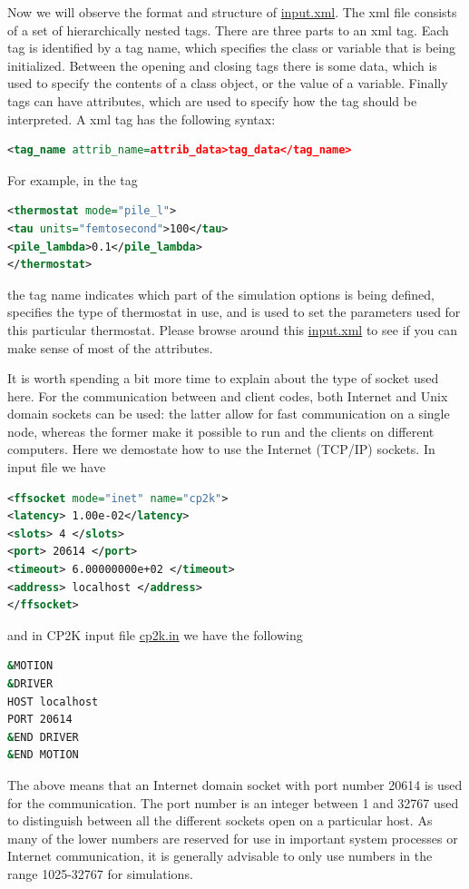 \documentclass{article}
\begin{document}
\begin{Exercise}[label={inputs},title={Keywords, outputs, and units of \ipi{}}]
\Question
Now we will observe the format and structure of \url{input.xml}.
The xml file consists of a set of hierarchically nested tags. There are three
parts to an xml tag. Each tag is identified by a tag name, which specifies the class
or variable that is being initialized. Between the opening and closing tags there is some data, 
which is used to specify the
contents of a class object, or the value of a variable. Finally tags can have attributes,
which are used to specify how the tag should be interpreted.
A xml tag has the following syntax:
\begin{lstlisting}[language=xml]
<tag_name attrib_name=attrib_data>tag_data</tag_name>
\end{lstlisting}
For example, in the tag
\begin{lstlisting}[language=xml]
<thermostat mode="pile_l">
<tau units="femtosecond">100</tau> 
<pile_lambda>0.1</pile_lambda>
</thermostat>
\end{lstlisting}
the tag name  indicates which part of the simulation options is being defined,
 specifies the type of thermostat in use,
and  is used to set the parameters used for this particular thermostat.
Please browse around this \url{input.xml} to see if you can make sense of most of the attributes.

\Question
It is worth spending a bit more time to explain about the type of socket used here.
For the communication between \ipi{} and client codes, both Internet and Unix domain sockets can be used: the
latter allow for fast communication on a single node, whereas the former make it possible
to run \ipi{} and the clients on different computers.
Here we demostate how to use the Internet (TCP/IP) sockets.
In \ipi{} input file we have
\begin{lstlisting}[language=xml]
<ffsocket mode="inet" name="cp2k">
<latency> 1.00e-02</latency>
<slots> 4 </slots>
<port> 20614 </port>
<timeout> 6.00000000e+02 </timeout>
<address> localhost </address>
</ffsocket> 
\end{lstlisting}
and in CP2K input file \url{cp2k.in} we have the following
\begin{lstlisting}[language=bash]
&MOTION
&DRIVER
HOST localhost
PORT 20614
&END DRIVER
&END MOTION
\end{lstlisting}
The above means that an Internet domain socket with port number 20614 is used for the communication.
The port number is an integer between 1 and 32767 used to distinguish between all the
different sockets open on a particular host. As many of the lower numbers are reserved
for use in important system processes or Internet communication, it is generally advisable
to only use numbers in the range 1025-32767 for simulations.


\end{Exercise}
\end{document}
